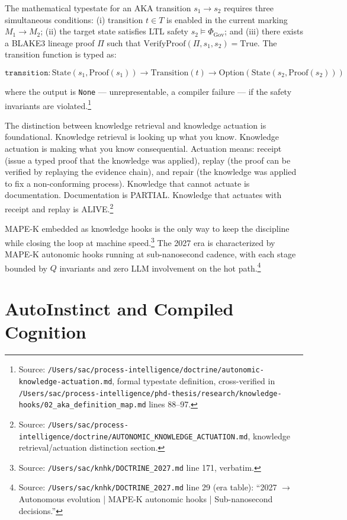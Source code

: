 The mathematical typestate for an AKA transition $s_1 \to s_2$ requires three simultaneous
conditions: (i) transition $t \in T$ is enabled in the current marking $M_1 \to M_2$;
(ii) the target state satisfies LTL safety $s_2 \vDash \Phi_\text{Gov}$; and (iii) there
exists a BLAKE3 lineage proof $\Pi$ such that $\text{VerifyProof}(\Pi, s_1, s_2) = \text{True}$.
The transition function is typed as:

\begin{equation}
  \texttt{transition} : \text{State}(s_1, \text{Proof}(s_1)) \to \text{Transition}(t) \to \text{Option}(\text{State}(s_2, \text{Proof}(s_2)))
\end{equation}

where the output is \texttt{None} --- unrepresentable, a compiler failure --- if the safety
invariants are violated.\footnote{Source:
\texttt{/Users/sac/process-intelligence/doctrine/autonomic-knowledge-actuation.md}, formal
typestate definition, cross-verified in
\texttt{/Users/sac/process-intelligence/phd-thesis/research/knowledge-hooks/02\_aka\_definition\_map.md}
lines 88--97.}

The distinction between knowledge retrieval and knowledge actuation is foundational. Knowledge
retrieval is looking up what you know. Knowledge actuation is making what you know
consequential. Actuation means: receipt (issue a typed proof that the knowledge was applied),
replay (the proof can be verified by replaying the evidence chain), and repair (the knowledge
was applied to fix a non-conforming process). Knowledge that cannot actuate is documentation.
Documentation is PARTIAL. Knowledge that actuates with receipt and replay is
ALIVE.\footnote{Source:
\texttt{/Users/sac/process-intelligence/doctrine/AUTONOMIC\_KNOWLEDGE\_ACTUATION.md},
knowledge retrieval/actuation distinction section.}

MAPE-K embedded as knowledge hooks is the only way to keep the discipline while closing the
loop at machine speed.\footnote{Source: \texttt{/Users/sac/knhk/DOCTRINE\_2027.md} line 171,
verbatim.} The 2027 era is characterized by MAPE-K autonomic hooks running at sub-nanosecond
cadence, with each stage bounded by $Q$ invariants and zero LLM involvement on the hot
path.\footnote{Source: \texttt{/Users/sac/knhk/DOCTRINE\_2027.md} line 29 (era table): ``2027
$\to$ Autonomous evolution | MAPE-K autonomic hooks | Sub-nanosecond decisions.''}

\section{AutoInstinct and Compiled Cognition}
\label{sec:autoinstinct}

